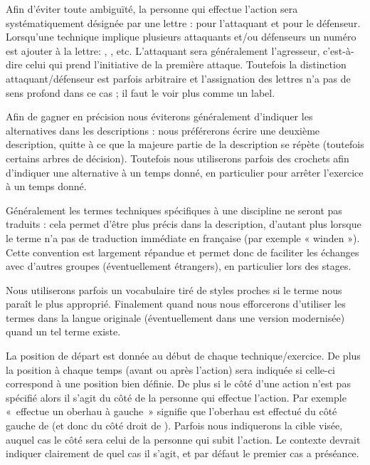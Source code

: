 Afin d'éviter toute ambiguïté, la personne qui effectue l'action sera systématiquement désignée par une lettre : \A pour l'attaquant et \D pour le défenseur.
Lorsqu'une technique implique plusieurs attaquants et/ou défenseurs un numéro est ajouter à la lettre: , , etc.
L'attaquant sera généralement l'agresseur, c'est-à-dire celui qui prend l'initiative de la première attaque.
Toutefois la distinction attaquant/défenseur est parfois arbitraire et l'assignation des lettres n'a pas de sens profond dans ce cas ; il faut le voir plus comme un label.

Afin de gagner en précision nous éviterons généralement d'indiquer les alternatives dans les descriptions : nous préférerons écrire une deuxième description, quitte à ce que la majeure partie de la description se répète (toutefois certains arbres de décision).
Toutefois nous utiliserons parfois des crochets afin d'indiquer une alternative à un temps donné, en particulier pour arrêter l'exercice à un temps donné.

Généralement les termes techniques spécifiques à une discipline ne seront pas traduits : cela permet d'être plus précis dans la description, d'autant plus lorsque le terme n'a pas de traduction immédiate en française (par exemple « winden »).
Cette convention est largement répandue et permet donc de faciliter les échanges avec d'autres groupes (éventuellement étrangers), en particulier lors des stages.

Nous utiliserons parfois un vocabulaire tiré de styles proches si le terme nous paraît le plus approprié.
Finalement quand nous nous efforcerons d'utiliser les termes dans la langue originale (éventuellement dans une version modernisée) quand un tel terme existe.

La position de départ est donnée au début de chaque technique/exercice.
De plus la position à chaque temps (avant ou après l'action) sera indiquée si celle-ci correspond à une position bien définie.
De plus si le côté d'une action n'est pas spécifié alors il s'agit du côté de la personne qui effectue l'action.
Par exemple « \A effectue un oberhau à gauche » signifie que l'oberhau est effectué du côté gauche de \A (et donc du côté droit de \D).
Parfois nous indiquerons la cible visée, auquel cas le côté sera celui de la personne qui subit l'action.
Le contexte devrait indiquer clairement de quel cas il s'agit, et par défaut le premier cas a préséance.

% 
